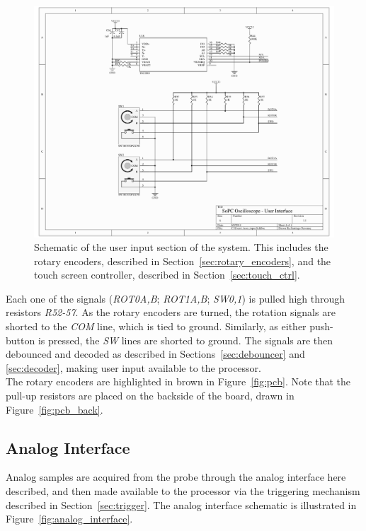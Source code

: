 \documentclass[titlepage]{scrartcl}
\begin{document}
	\begin{figure}[h!]
	\vspace{-2cm}
	\centerline{\includegraphics[width=26cm, angle=90, origin=c]{img/user_input.pdf}}
                	\caption{Schematic of the user input section of the system. This includes the rotary encoders, described in Section~\ref{sec:rotary_encoders}, and the touch screen controller, described in Section~\ref{sec:touch_ctrl}.}
               	\label{fig:user_input}
	\end{figure}

	Each one of the signals (\textit{ROT0A,B}; \textit{ROT1A,B}; \textit{SW0,1}) is pulled high through resistors \textit{R52-57}. As the rotary encoders are turned, the rotation signals are shorted to the \textit{COM} line, which is tied to ground. Similarly, as either push-button is pressed, the \textit{SW} lines are shorted to ground. The signals are then debounced and decoded as described in Sections~\ref{sec:debouncer} and \ref{sec:decoder}, making user input available to the processor.\\

	The rotary encoders are highlighted in brown in Figure~\ref{fig:pcb}. Note that the pull-up resistors are placed on the backside of the board, drawn in Figure~\ref{fig:pcb_back}.\\

	\clearpage
	
	\subsection{Analog Interface \label{sec:analog_interface}}
	Analog samples are acquired from the probe through the analog interface here described, and then made available to the processor via the triggering mechanism described in Section~\ref{sec:trigger}. The analog interface schematic is illustrated in Figure~\ref{fig:analog_interface}.\\
\end{document}
